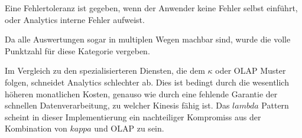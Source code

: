 Eine Fehlertoleranz ist gegeben, wenn der Anwender keine Fehler selbst einführt, oder \AWSIOT{} Analytics interne Fehler aufweist.

Da alle Auswertungen sogar in multiplen Wegen machbar sind, wurde die volle Punktzahl für diese Kategorie vergeben.

Im Vergleich zu den spezialisierteren Diensten, die dem $\kappa$ oder \ac{OLAP} Muster folgen, schneidet \AWSIOT{} Analytics schlechter ab. Dies ist bedingt durch die wesentlich höheren monatlichen Kosten, genauso wie durch eine fehlende Garantie der schnellen Datenverarbeitung, zu welcher Kinesis fähig ist. Das $lambda$ Pattern scheint in dieser Implementierung ein nachteiliger Kompromiss aus der Kombination von $kappa$ und \ac{OLAP} zu sein.
